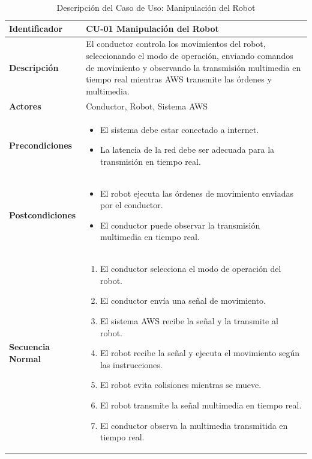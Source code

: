         \begin{longtable}{|p{4cm}|p{10cm}|}
        \caption{Descripci\'on del Caso de Uso: Manipulaci\'on del Robot} \\
        \hline
        \textbf{Identificador}     & CU-01 Manipulaci\'on del Robot \\ \hline
        \textbf{Descripci\'on}       & El conductor controla los movimientos del robot, seleccionando el modo de operaci\'on, enviando comandos de movimiento y observando la transmisi\'on multimedia en tiempo real mientras AWS transmite las \'ordenes y multimedia. \\ \hline
        \textbf{Actores}           & Conductor, Robot, Sistema AWS \\ \hline
        \textbf{Precondiciones}    & 
        \begin{itemize}
            \item El sistema debe estar conectado a internet.
            \item La latencia de la red debe ser adecuada para la transmisi\'on en tiempo real.
        \end{itemize} \\ \hline
        \textbf{Postcondiciones}   & 
        \begin{itemize}
            \item El robot ejecuta las \'ordenes de movimiento enviadas por el conductor.
            \item El conductor puede observar la transmisi\'on multimedia en tiempo real.
        \end{itemize} \\ \hline
        \textbf{Secuencia Normal}  & 
        \begin{enumerate}
            \item El conductor selecciona el modo de operaci\'on del robot.
            \item El conductor env\'ia una se\~nal de movimiento.
            \item El sistema AWS recibe la se\~nal y la transmite al robot.
            \item El robot recibe la se\~nal y ejecuta el movimiento seg\'un las instrucciones.
            \item El robot evita colisiones mientras se mueve.
            \item El robot transmite la se\~nal multimedia en tiempo real.
            \item El conductor observa la multimedia transmitida en tiempo real.

\end{enumerate}
\end{longtable}
